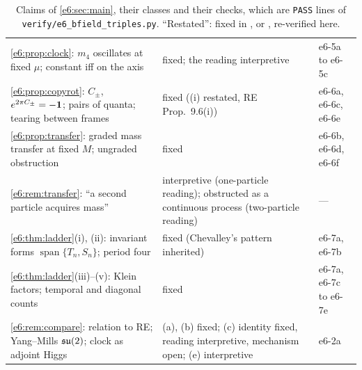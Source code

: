 \begin{table}[htbp]
\begin{tabular}{@{}>{\raggedright\arraybackslash}p{8.0cm}>{\raggedright\arraybackslash}p{4.7cm}>{\raggedright\arraybackslash}p{2.1cm}@{}}
\cref{e6:prop:clock}: $m_4$ oscillates at fixed $\mu$; constant iff on the axis & fixed; the reading interpretive & e6-5a to e6-5c\\
\cref{e6:prop:copyrot}: $C_\pm$, $e^{2\pi C_\pm}=-\mathbf 1$; pairs of quanta; tearing between frames & fixed ((i) restated, RE Prop.~9.6(i)) & e6-6a, e6-6c, e6-6e\\
\cref{e6:prop:transfer}: graded mass transfer at fixed $M$; ungraded obstruction & fixed & e6-6b, e6-6d, e6-6f\\
\cref{e6:rem:transfer}: ``a second particle acquires mass'' & interpretive (one-particle reading); obstructed as a continuous process (two-particle reading) & ---\\
\cref{e6:thm:ladder}(i), (ii): invariant forms $\operatorname{span}\{T_n,S_n\}$; period four & fixed (Chevalley's pattern inherited) & e6-7a, e6-7b\\
\cref{e6:thm:ladder}(iii)--(v): Klein factors; temporal and diagonal counts & fixed & e6-7a, e6-7c to e6-7e\\
\cref{e6:rem:compare}: relation to RE; Yang--Mills $\mathfrak{su}(2)$; clock as adjoint Higgs & (a), (b) fixed; (c) identity fixed, reading interpretive, mechanism open; (e) interpretive & e6-2a\\
\bottomrule
\end{tabular}
\caption{Claims of \cref{e6:sec:main}, their classes and their checks, which are \texttt{PASS} lines of \texttt{verify/e6\_bfield\_triples.py}. ``Restated'':
fixed in \cite{ES17}, \cite{RE} or \cite{TR}, re-verified here.}
\label{e6:tab:claims}
\end{table}
